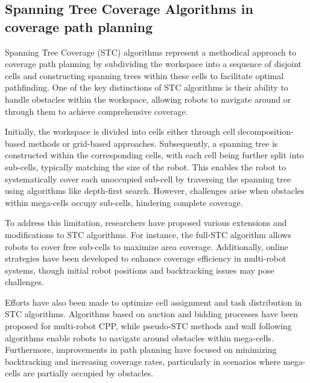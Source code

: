 \subsection{Spanning Tree Coverage Algorithms in coverage path planning}

Spanning Tree Coverage (STC) algorithms represent a methodical approach to coverage path planning by subdividing the workspace into a sequence of disjoint cells and constructing spanning trees within these cells to facilitate optimal pathfinding. One of the key distinctions of STC algorithms is their ability to handle obstacles within the workspace, allowing robots to navigate around or through them to achieve comprehensive coverage.

\vspace*{6mm}

Initially, the workspace is divided into cells either through cell decomposition-based methods or grid-based approaches. Subsequently, a spanning tree is constructed within the corresponding cells, with each cell being further split into sub-cells, typically matching the size of the robot. This enables the robot to systematically cover each unoccupied sub-cell by traversing the spanning tree using algorithms like depth-first search. However, challenges arise when obstacles within mega-cells occupy sub-cells, hindering complete coverage.

\vspace*{6mm}

To address this limitation, researchers have proposed various extensions and modifications to STC algorithms. For instance, the full-STC algorithm allows robots to cover free sub-cells to maximize area coverage. Additionally, online strategies have been developed to enhance coverage efficiency in multi-robot systems, though initial robot positions and backtracking issues may pose challenges.

\vspace*{6mm}

Efforts have also been made to optimize cell assignment and task distribution in STC algorithms. Algorithms based on auction and bidding processes have been proposed for multi-robot CPP, while pseudo-STC methods and wall following algorithms enable robots to navigate around obstacles within mega-cells. Furthermore, improvements in path planning have focused on minimizing backtracking and increasing coverage rates, particularly in scenarios where mega-cells are partially occupied by obstacles.

\vspace*{6mm}


